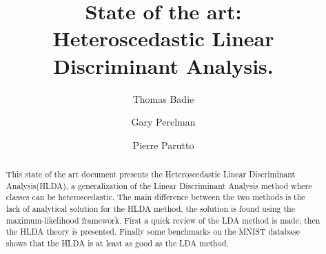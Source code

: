 \documentclass{article}
\title{State of the art:\\Heteroscedastic Linear Discriminant Analysis.}
\author{Thomas Badie \and Gary Perelman \and Pierre Parutto}
\begin{document}
\maketitle
\begin{abstract}
  This state of the art document presents the Heteroscedastic Linear Discriminant Analysis(HLDA),
  a generalization of the Linear Discriminant Analysis method where classes can be heteroscedastic.
  The main difference between the two methods is the lack of analytical solution for the HLDA method,
  the solution is found using the maximum-likelihood framework.
  First a quick review of the LDA method is made, then the HLDA theory is presented. Finally some
  benchmarks on the MNIST database shows that the HLDA is at least as good as the LDA method.
\end{abstract}


\newpage
\tableofcontents











\end{document}
